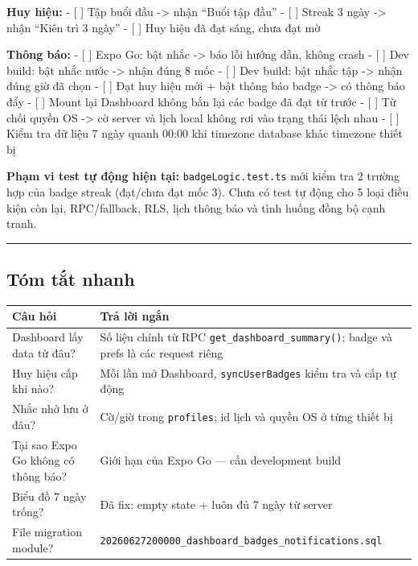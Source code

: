 \documentclass[12pt,a4paper]{article}
\newcounter{none}
\begin{document}
\textbf{Huy hiệu:} - {[} {]} Tập buổi đầu -\textgreater{} nhận ``Buổi
tập đầu'' - {[} {]} Streak 3 ngày -\textgreater{} nhận ``Kiên trì 3
ngày'' - {[} {]} Huy hiệu đã đạt sáng, chưa đạt mờ

\textbf{Thông báo:} - {[} {]} Expo Go: bật nhắc -\textgreater{} báo lỗi
hướng dẫn, không crash - {[} {]} Dev build: bật nhắc nước
-\textgreater{} nhận đúng 8 mốc - {[} {]} Dev build: bật nhắc tập
-\textgreater{} nhận đúng giờ đã chọn - {[} {]} Đạt huy hiệu mới + bật
thông báo badge -\textgreater{} có thông báo đẩy - {[} {]} Mount lại
Dashboard không bắn lại các badge đã đạt từ trước - {[} {]} Từ chối
quyền OS -\textgreater{} cờ server và lịch local không rơi vào trạng
thái lệch nhau - {[} {]} Kiểm tra dữ liệu 7 ngày quanh 00:00 khi
timezone database khác timezone thiết bị

\textbf{Phạm vi test tự động hiện tại:} \texttt{badgeLogic.test.ts} mới
kiểm tra 2 trường hợp của badge streak (đạt/chưa đạt mốc 3). Chưa có
test tự động cho 5 loại điều kiện còn lại, RPC/fallback, RLS, lịch thông
báo và tình huống đồng bộ cạnh tranh.

\begin{center}\rule{0.5\linewidth}{0.5pt}\end{center}

\subsection{Tóm tắt nhanh}\label{tuxf3m-tux1eaft-nhanh}

{\def\LTcaptype{none} %
\begin{longtable}[]{@{}
  >{\raggedright\arraybackslash}p{}
  >{\raggedright\arraybackslash}p{}@{}}
\toprule\noalign{}
\begin{minipage}[b]{\linewidth}\raggedright
Câu hỏi
\end{minipage} & \begin{minipage}[b]{\linewidth}\raggedright
Trả lời ngắn
\end{minipage} \\
\midrule\noalign{}
\endhead
\bottomrule\noalign{}
\endlastfoot
Dashboard lấy data từ đâu? & Số liệu chính từ RPC
\texttt{get\_dashboard\_summary()}; badge và prefs là các request
riêng \\
Huy hiệu cấp khi nào? & Mỗi lần mở Dashboard, \texttt{syncUserBadges}
kiểm tra và cấp tự động \\
Nhắc nhở lưu ở đâu? & Cờ/giờ trong \texttt{profiles}; id lịch và quyền
OS ở từng thiết bị \\
Tại sao Expo Go không có thông báo? & Giới hạn của Expo Go --- cần
development build \\
Biểu đồ 7 ngày trống? & Đã fix: empty state + luôn đủ 7 ngày từ
server \\
File migration module? &
\texttt{20260627200000\_dashboard\_badges\_notifications.sql} \\
\end{longtable}
}
\end{document}
